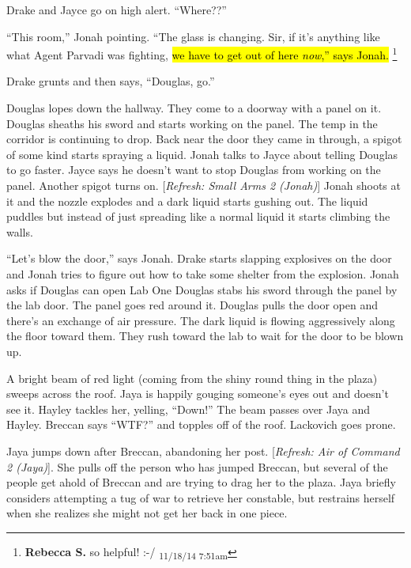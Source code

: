 Drake and Jayce go on high alert.  ``Where??''

``This room,'' Jonah pointing.  ``The glass is changing.  Sir, if it's anything like what Agent Parvadi was fighting, \hl{we have to get out of here \textit{now},'' says Jonah. }\footnote{\textbf{Rebecca S. }so helpful! :-/ \textsubscript{11/18/14 7:51am}} 

Drake grunts and then says, ``Douglas, go.''

Douglas lopes down the hallway. They come to a doorway with a panel on it.  Douglas sheaths his sword and starts working on the panel.  The temp in the corridor is continuing to drop.  Back near the door they came in through, a spigot of some kind starts spraying a liquid.  Jonah talks to Jayce about telling Douglas to go faster.  Jayce says he doesn't want to stop Douglas from working on the panel.  Another spigot turns on.  {[}\textit{Refresh: Small Arms 2 (Jonah)}{]}  Jonah shoots at it and the nozzle explodes and a dark liquid starts gushing out.  The liquid puddles but instead of just spreading like a normal liquid it starts climbing the walls.



``Let's blow the door,'' says Jonah.  Drake starts slapping explosives on the door and Jonah tries to figure out how to take some shelter from the explosion.  Jonah asks if Douglas can open Lab One  Douglas stabs his sword through the panel by the lab door.  The panel goes red around it.  Douglas pulls the door open and there's an exchange of air pressure.  The dark liquid is flowing aggressively along the floor toward them.  They rush toward the lab to wait for the door to be blown up.





A bright beam of red light (coming from the shiny round thing in the plaza) sweeps across the roof.  Jaya is happily gouging someone's eyes out and doesn't see it.  Hayley tackles her, yelling, ``Down!''  The beam passes over Jaya and Hayley.  Breccan says ``WTF?'' and topples off of the roof.  Lackovich goes prone.



Jaya jumps down after Breccan, abandoning her post. {[}\textit{Refresh: Air of Command 2 (Jaya)}{]}.  She pulls off the person who has jumped Breccan, but several of the people get ahold of Breccan and are trying to drag her to the plaza.  Jaya briefly considers attempting a tug of war to retrieve her constable, but restrains herself when she realizes she might not get her back in one piece.



